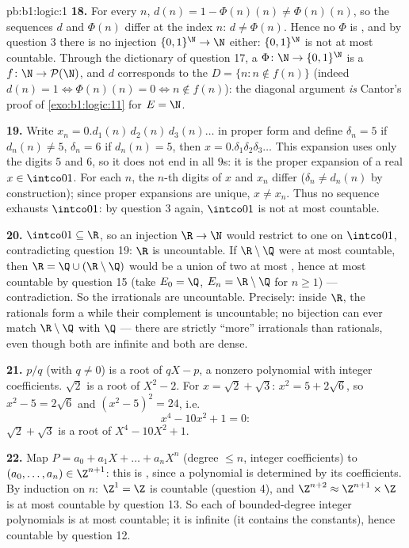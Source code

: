 \begin{solution}{pb:b1:logic:1}
\textbf{18.} For every $n$, $d(n) = 1 - \Phi(n)(n) \neq \Phi(n)(n)$,
so the sequences $d$ and $\Phi(n)$ differ at the index $n$: $d \neq
\Phi(n)$. Hence no $\Phi$ is , and by question 3 there is
no injection $\{0,1\}^{\N} \to \N$ either: $\{0,1\}^{\N}$ is not at
most countable. Through the dictionary of question 17, a  $\Phi
\colon \N \to \{0,1\}^{\N}$ is a  $f \colon \N \to
\mathcal{P}(\N)$, and $d$ corresponds to the  $D = \{n : n
\notin f(n)\}$ (indeed $d(n) = 1 \iff \Phi(n)(n) = 0 \iff n \notin
f(n)$): the diagonal argument \emph{is} Cantor's proof of
\cref{exo:b1:logic:11} for $E = \N$.

\textbf{19.} Write $x_n = 0.d_1(n)\,d_2(n)\,d_3(n)\dots$ in proper
form and define $\delta_n = 5$ if $d_n(n) \neq 5$, $\delta_n = 6$
if $d_n(n) = 5$, then $x = 0.\delta_1\delta_2\delta_3\dots$ This
expansion uses only the digits $5$ and $6$, so it does not end in
all $9$s: it is the proper expansion of a real $x \in \intco01$.
For each $n$, the $n$-th digits of $x$ and $x_n$ differ
($\delta_n \neq d_n(n)$ by construction); since proper expansions
are unique, $x \neq x_n$. Thus no sequence exhausts $\intco01$: by
question 3 again, $\intco01$ is not at most countable.

\textbf{20.} $\intco01 \subseteq \R$, so an injection $\R \to \N$
would restrict to one on $\intco01$, contradicting question 19:
$\R$ is uncountable. If $\R \setminus \Q$ were at most countable,
then $\R = \Q \cup (\R \setminus \Q)$ would be a union of two at
most , hence at most countable by question 15 (take
$E_0 = \Q$, $E_n = \R \setminus \Q$ for $n \geq 1$) ---
contradiction. So the irrationals are uncountable. Precisely:
inside $\R$, the rationals form a  while their
complement is uncountable; no bijection can ever match $\R
\setminus \Q$ with $\Q$ --- there are strictly ``more'' irrationals
than rationals, even though both are infinite and both are dense.

\textbf{21.} $p/q$ (with $q \neq 0$) is a root of $qX - p$, a
nonzero polynomial with integer coefficients. $\sqrt 2$ is a root
of $X^2 - 2$. For $x = \sqrt 2 + \sqrt 3$: $x^2 = 5 + 2\sqrt 6$, so
$x^2 - 5 = 2\sqrt 6$ and $(x^2 - 5)^2 = 24$, i.e.\
\[
x^4 - 10x^2 + 1 = 0 :
\]
$\sqrt 2 + \sqrt 3$ is a root of $X^4 - 10X^2 + 1$.

\textbf{22.} Map $P = a_0 + a_1X + \dots + a_nX^n$ (degree $\leq n$,
integer coefficients) to $(a_0, \dots, a_n) \in \Z^{n+1}$: this is
\omterm{def:b1:logic:inj}{injective}, since a polynomial is determined by its coefficients. By
induction on $n$: $\Z^1 = \Z$ is countable (question 4), and
$\Z^{n+2} \approx \Z^{n+1} \times \Z$ is at most countable by
question 13. So each  of bounded-degree integer polynomials is
at most countable; it is infinite (it contains the constants), hence
countable by question 12.


\end{solution}
